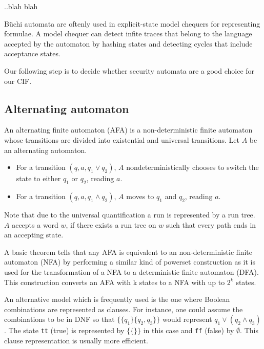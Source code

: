 \documentclass[a4paper,10pt]{article}
\begin{document}
..blah blah

B\"uchi automata are oftenly used in explicit-state model chequers for
representing formulae.
A model chequer can detect infite traces that belong to the language accepted
by the automaton by hashing states and detecting cycles that include acceptance
states.

Our following step is to decide whether security automata are a good choice for
our CIF.

\subsection{Alternating automaton}\label{subsec:AlterAut}
An alternating finite automaton (AFA) is a non-deterministic finite automaton
whose transitions are divided into existential and universal transitions. Let
$A$ be an alternating automaton.

\begin{itemize}
  \item For a transition $(q, a, q_1 \vee q_2)$, $A$ nondeterministically
chooses to switch the state to either $q_1$ or $q_2$, reading $a$.
  \item For a transition $(q, a, q_1 \wedge q_2)$, $A$ moves to $q_1$ and $q_2$,
reading $a$.
\end{itemize}

Note that due to the universal quantification a run is represented by a run
tree. $A$ accepts a word $w$, if there exists a run tree on $w$ such that every
path ends in an accepting state.

A basic theorem tells that any AFA is equivalent to an non-deterministic finite
automaton (NFA) by performing a similar kind of powerset construction as it is
used for the transformation of a NFA to a deterministic finite automaton (DFA).
This construction converts an AFA with k states to a NFA with up to $2^k$
states.

An alternative model which is frequently used is the one where Boolean
combinations are represented as clauses. For instance, one could assume the
combinations to be in DNF so that $\{\{q_1\}\{q_2,q_3\}\}$ would represent $q_1
\vee (q_2 \wedge q_3)$. The state \texttt{tt} (true) is represented by
$\{\{\}\}$ in this case and \texttt{ff} (false) by $\emptyset$. This clause
representation is usually more efficient.
\end{document}
